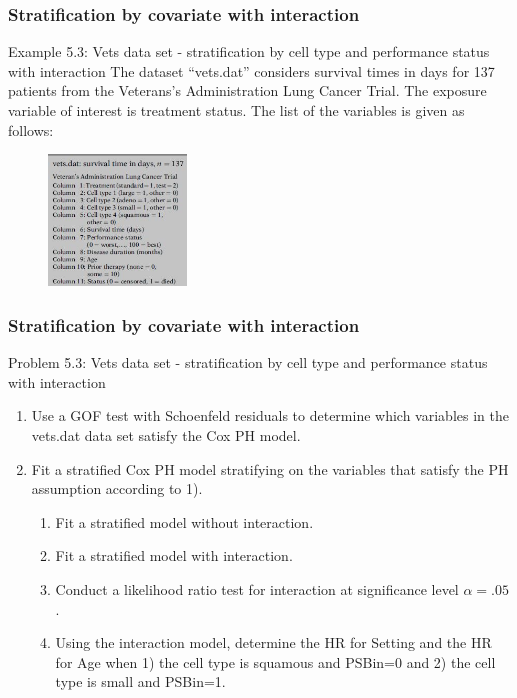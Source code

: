 \documentclass{beamer}
\theoremstyle{definition}
\begin{document}
\begin{frame}
\frametitle{Stratification by covariate with interaction}
\begin{block}{Example 5.3: Vets data set - stratification by cell type and performance status with interaction}
The dataset ``vets.dat'' considers survival times in days for 137 patients from the Veterans's Administration Lung Cancer Trial. The exposure variable of interest is treatment status.
The list of the variables is given as follows:
\begin{figure}
    \centering
    \includegraphics[height=3.5cm]{Ch5_vets.JPG}
  \end{figure}
\end{block}
\end{frame}

\begin{frame}
\frametitle{Stratification by covariate with interaction}
\begin{block}{Problem 5.3: Vets data set - stratification by cell type and performance status with interaction}
\begin{enumerate}
\item Use a GOF test with Schoenfeld residuals to determine which variables in the vets.dat data set satisfy the Cox PH model.
\item Fit a stratified Cox PH model stratifying on the variables that satisfy the PH assumption according to 1).
 \begin{enumerate}
 \item Fit a stratified model without interaction.
 \item Fit a stratified model with interaction.
\item Conduct a likelihood ratio test for interaction at significance level $\alpha=.05$.
\item Using the interaction model, determine the HR for Setting and the HR for Age when 1) the cell type is squamous and PSBin=0 and 2) the cell type is small and PSBin=1. 
\end{enumerate}
\end{enumerate} 
\end{block}
\end{frame}
\end{document}
